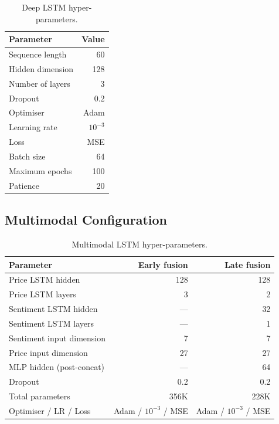\documentclass[12pt,a4paper,oneside]{report}
\begin{document}
\begin{table}[H]
  \centering
  \caption{Deep \ac{LSTM} hyper-parameters.}
  \label{tab:lstm}
  \begin{tabular}{lr}
    \toprule
    Parameter & Value \\
    \midrule
    Sequence length  & 60 \\
    Hidden dimension & 128 \\
    Number of layers & 3 \\
    Dropout          & 0.2 \\
    Optimiser        & Adam \\
    Learning rate    & $10^{-3}$ \\
    Loss             & \ac{MSE} \\
    Batch size       & 64 \\
    Maximum epochs   & 100 \\
    Patience         & 20 \\
    \bottomrule
  \end{tabular}
\end{table}

\subsection{Multimodal Configuration}

\begin{table}[H]
  \centering
  \caption{Multimodal \ac{LSTM} hyper-parameters.}
  \label{tab:mm}
  \begin{tabular}{lrr}
    \toprule
    Parameter & Early fusion & Late fusion \\
    \midrule
    Price \ac{LSTM} hidden   & 128 & 128 \\
    Price \ac{LSTM} layers   & 3   & 2   \\
    Sentiment \ac{LSTM} hidden & --- & 32  \\
    Sentiment \ac{LSTM} layers & --- & 1   \\
    Sentiment input dimension & 7   & 7   \\
    Price input dimension   & 27  & 27  \\
    \ac{MLP} hidden (post-concat) & --- & 64  \\
    Dropout                 & 0.2 & 0.2 \\
    Total parameters        & 356K & 228K \\
    Optimiser / LR / Loss   & Adam / $10^{-3}$ / \ac{MSE} & Adam / $10^{-3}$ / \ac{MSE} \\
    \bottomrule
  \end{tabular}
\end{table}
\end{document}
